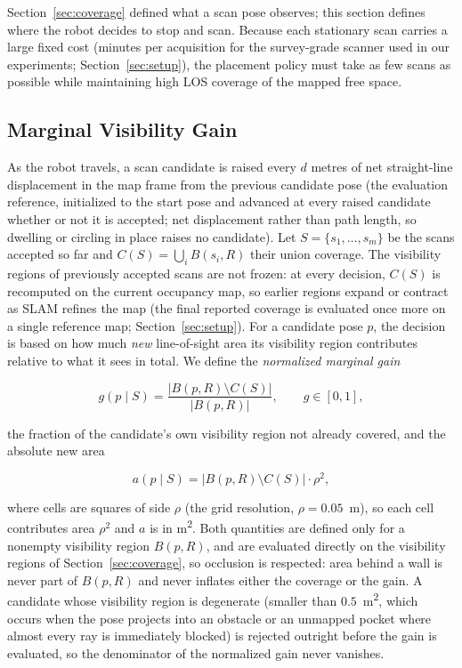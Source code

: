 \documentclass[sensors,article,submit,pdftex,moreauthors]{Definitions/mdpi}
\begin{document}
Section~\ref{sec:coverage} defined what a scan pose observes; this section
defines where the robot decides to stop and scan. Because each stationary scan
carries a large fixed cost (minutes per acquisition for the survey-grade
scanner used in our experiments; Section~\ref{sec:setup}), the placement
policy must take as few scans as possible while maintaining high LOS coverage
of the mapped free space.

\subsection{Marginal Visibility Gain}

As the robot travels, a scan candidate is raised every $d$ metres of net
straight-line displacement in the map frame from the previous candidate pose
(the evaluation reference, initialized to the start pose and advanced at every
raised candidate whether or not it is accepted; net displacement rather than
path length, so dwelling or circling in place raises no candidate). Let $S=\{s_1,\dots,s_m\}$ be the scans accepted so far and
$C(S)=\bigcup_i B(s_i,R)$ their union coverage. The visibility regions of
previously accepted scans are not frozen: at every decision, $C(S)$ is
recomputed on the current occupancy map, so earlier regions expand or contract
as SLAM refines the map (the final reported coverage is evaluated once more on
a single reference map; Section~\ref{sec:setup}). For a candidate pose $p$,
the decision is based on how much \emph{new} line-of-sight area its visibility
region contributes relative to what it sees in total. We define the
\emph{normalized marginal gain}

\begin{equation}
g(p\mid S)=\frac{\lvert B(p,R)\setminus C(S)\rvert}{\lvert B(p,R)\rvert},
\qquad g\in[0,1],
\end{equation}

the fraction of the candidate's own visibility region not already covered, and
the absolute new area

\begin{equation}
a(p\mid S)=\lvert B(p,R)\setminus C(S)\rvert\cdot\rho^2,
\end{equation}

where cells are squares of side $\rho$ (the grid resolution,
$\rho=0.05$~m), so each cell contributes area $\rho^2$ and $a$ is in
m\textsuperscript{2}. Both quantities are defined only for a nonempty
visibility region $B(p,R)$, and are evaluated directly on the visibility
regions of Section~\ref{sec:coverage}, so occlusion is respected: area behind
a wall is never part of $B(p,R)$ and never inflates either the coverage or the
gain. A candidate whose visibility region is degenerate (smaller than
$0.5$~m\textsuperscript{2}, which occurs when the pose projects into an
obstacle or an unmapped pocket where almost every ray is immediately blocked)
is rejected outright before the gain is evaluated, so the denominator of the
normalized gain never vanishes.
\end{document}
